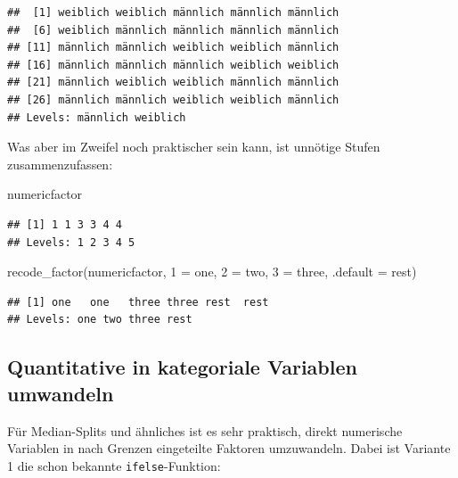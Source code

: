 \documentclass[
]{book}
\newenvironment{Shaded}{\begin{snugshade}}{\end{snugshade}}
\newcommand{\AttributeTok}[1]{\textcolor[rgb]{0.77,0.63,0.00}{#1}}
\newcommand{\FunctionTok}[1]{\textcolor[rgb]{0.00,0.00,0.00}{#1}}
\newcommand{\NormalTok}[1]{#1}
\newcommand{\OtherTok}[1]{\textcolor[rgb]{0.56,0.35,0.01}{#1}}
\newcommand{\StringTok}[1]{\textcolor[rgb]{0.31,0.60,0.02}{#1}}
\begin{document}
\begin{verbatim}
##  [1] weiblich weiblich männlich männlich männlich
##  [6] weiblich männlich männlich männlich männlich
## [11] männlich männlich weiblich weiblich männlich
## [16] männlich männlich männlich weiblich weiblich
## [21] männlich weiblich weiblich männlich männlich
## [26] männlich männlich weiblich weiblich männlich
## Levels: männlich weiblich
\end{verbatim}

Was aber im Zweifel noch praktischer sein kann, ist unnötige Stufen zusammenzufassen:

\begin{Shaded}
\begin{Highlighting}[]
\NormalTok{numericfactor}
\end{Highlighting}
\end{Shaded}

\begin{verbatim}
## [1] 1 1 3 3 4 4
## Levels: 1 2 3 4 5
\end{verbatim}

\begin{Shaded}
\begin{Highlighting}[]
\FunctionTok{recode\_factor}\NormalTok{(numericfactor,}
              \StringTok{\textquotesingle{}1\textquotesingle{}} \OtherTok{=} \StringTok{\textquotesingle{}one\textquotesingle{}}\NormalTok{,}
              \StringTok{\textquotesingle{}2\textquotesingle{}} \OtherTok{=} \StringTok{\textquotesingle{}two\textquotesingle{}}\NormalTok{,}
              \StringTok{\textquotesingle{}3\textquotesingle{}} \OtherTok{=} \StringTok{\textquotesingle{}three\textquotesingle{}}\NormalTok{,}
              \AttributeTok{.default =} \StringTok{\textquotesingle{}rest\textquotesingle{}}\NormalTok{)}
\end{Highlighting}
\end{Shaded}

\begin{verbatim}
## [1] one   one   three three rest  rest 
## Levels: one two three rest
\end{verbatim}

\hypertarget{quantitative-in-kategoriale-variablen-umwandeln}{%
\subsection{Quantitative in kategoriale Variablen umwandeln}\label{quantitative-in-kategoriale-variablen-umwandeln}}

Für Median-Splits und ähnliches ist es sehr praktisch, direkt numerische Variablen in nach Grenzen eingeteilte Faktoren umzuwandeln. Dabei ist Variante 1 die schon bekannte \texttt{ifelse}-Funktion:
\end{document}
